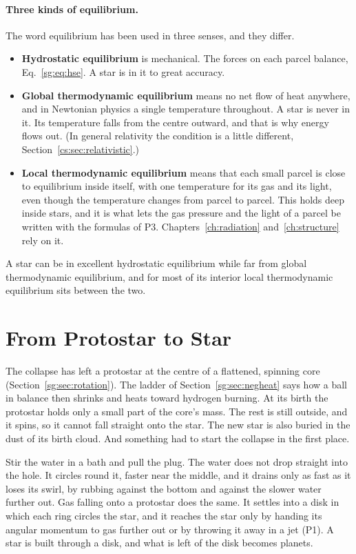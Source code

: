 \paragraph{Three kinds of equilibrium.} The word equilibrium has been used in three senses, and they differ.
\begin{itemize}
	\item \textbf{Hydrostatic equilibrium} is mechanical. The forces on each parcel balance, Eq.~\eqref{sg:eq:hse}. A star is in it to great accuracy.
	\item \textbf{Global thermodynamic equilibrium} means no net flow of heat anywhere, and in Newtonian physics a single temperature throughout. A star is never in it. Its temperature falls from the centre outward, and that is why energy flows out. (In general relativity the condition is a little different, Section~\ref{cs:sec:relativistic}.)
	\item \textbf{Local thermodynamic equilibrium} means that each small parcel is close to equilibrium inside itself, with one temperature for its gas and its light, even though the temperature changes from parcel to parcel. This holds deep inside stars, and it is what lets the gas pressure and the light of a parcel be written with the formulas of P3. Chapters~\ref{ch:radiation} and~\ref{ch:structure} rely on it.
\end{itemize}
A star can be in excellent hydrostatic equilibrium while far from global thermodynamic equilibrium, and for most of its interior local thermodynamic equilibrium sits between the two.

\section{From Protostar to Star}
\label{sg:sec:protostar}

The collapse has left a protostar at the centre of a flattened, spinning core (Section~\ref{sg:sec:rotation}). The ladder of Section~\ref{sg:sec:negheat} says how a ball in balance then shrinks and heats toward hydrogen burning. At its birth the protostar holds only a small part of the core's mass. The rest is still outside, and it spins, so it cannot fall straight onto the star. The new star is also buried in the dust of its birth cloud. And something had to start the collapse in the first place.

Stir the water in a bath and pull the plug. The water does not drop straight into the hole. It circles round it, faster near the middle, and it drains only as fast as it loses its swirl, by rubbing against the bottom and against the slower water further out. Gas falling onto a protostar does the same. It settles into a disk in which each ring circles the star, and it reaches the star only by handing its angular momentum to gas further out or by throwing it away in a jet (P1). A star is built through a disk, and what is left of the disk becomes planets.

